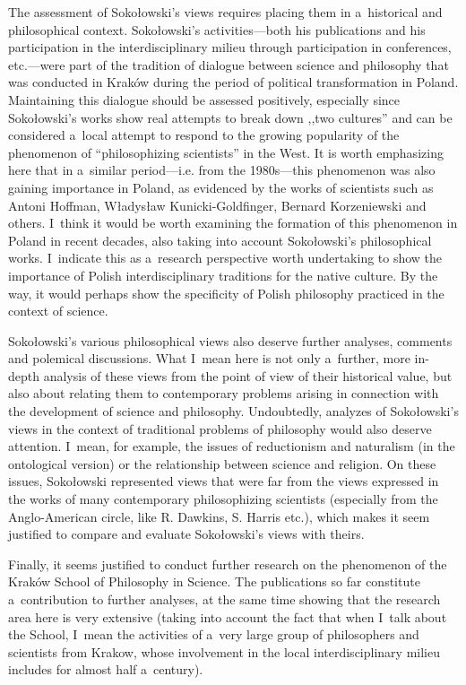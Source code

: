 \documentclass[%
  manuscript=article,
  year=2024,
  volume=77,
  doi=00000.000,
]{zfn}
\begin{document}
The assessment of Sokołowski's views requires placing them in a~historical and philosophical context. Sokołowski's activities---both his publications and his participation in the interdisciplinary milieu through participation in conferences, etc.---were part of the tradition of dialogue between science and philosophy that was conducted in Kraków during the period of political transformation in Poland. Maintaining this dialogue should be assessed positively, especially since Sokołowski's works show real attempts to break down ,,two cultures'' 
\parencite[][]{Snow1999Dwie} %
 and can be considered a~local attempt to respond to the growing popularity of the phenomenon of ``philosophizing scientists'' in the West. It is worth emphasizing here that in a~similar period---i.e. from the 1980s---this phenomenon was also gaining importance in Poland, as evidenced by the works of scientists such as Antoni Hoffman, Władysław Kunicki-Goldfinger, Bernard Korzeniewski and others. I~think it would be worth examining the formation of this phenomenon in Poland in recent decades, also taking into account Sokołowski's philosophical works. I~indicate this as a~research perspective worth undertaking to show the importance of Polish interdisciplinary traditions for the native culture. By the way, it would perhaps show the specificity of Polish philosophy practiced in the context of science.



Sokołowski's various philosophical views also deserve further analyses, comments and polemical discussions. What I~mean here is not only a~further, more in-depth analysis of these views from the point of view of their historical value, but also about relating them to contemporary problems arising in connection with the development of science and philosophy. Undoubtedly, analyzes of Sokołowski's views in the context of traditional problems of philosophy would also deserve attention. I~mean, for example, the issues of reductionism and naturalism (in the ontological version) or the relationship between science and religion. On these issues, Sokołowski represented views that were far from the views expressed in the works of many contemporary philosophizing scientists (especially from the Anglo-American circle, like R. Dawkins, S. Harris etc.), which makes it seem justified to compare and evaluate Sokołowski's views with theirs.



Finally, it seems justified to conduct further research on the phenomenon of the Kraków School of Philosophy in Science. The publications so far constitute a~contribution to further analyses, at the same time showing that the research area here is very extensive (taking into account the fact that when I~talk about the School, I~mean the activities of a~very large group of philosophers and scientists from Krakow, whose involvement in the local interdisciplinary milieu includes for almost half a~century).





\printbibliography
\end{document}
